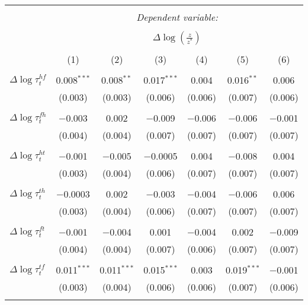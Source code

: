 \begin{tabular}{@{\extracolsep{5pt}}lcccccc} 
\\[-1.8ex]\hline 
\hline \\[-1.8ex] 
 & \multicolumn{6}{c}{\textit{Dependent variable:}} \\ 
\cline{2-7} 
\\[-1.8ex] & \multicolumn{6}{c}{$\Delta \log \left(\frac{z}{z^*} \right)$} \\ 
\\[-1.8ex] & (1) & (2) & (3) & (4) & (5) & (6)\\ 
\hline \\[-1.8ex] 
 $\Delta \log \tau_t^{hf}$ & 0.008$^{***}$ & 0.008$^{**}$ & 0.017$^{***}$ & 0.004 & 0.016$^{**}$ & 0.006 \\ 
  & (0.003) & (0.003) & (0.006) & (0.006) & (0.007) & (0.006) \\ 
  & & & & & & \\ 
 $\Delta \log \tau_t^{fh}$ & $-$0.003 & 0.002 & $-$0.009 & $-$0.006 & $-$0.006 & $-$0.001 \\ 
  & (0.004) & (0.004) & (0.007) & (0.007) & (0.007) & (0.007) \\ 
  & & & & & & \\ 
 $\Delta \log \tau_t^{ht}$ & $-$0.001 & $-$0.005 & $-$0.0005 & 0.004 & $-$0.008 & 0.004 \\ 
  & (0.003) & (0.004) & (0.006) & (0.007) & (0.007) & (0.007) \\ 
  & & & & & & \\ 
 $\Delta \log \tau_t^{th}$ & $-$0.0003 & 0.002 & $-$0.003 & $-$0.004 & $-$0.006 & 0.006 \\ 
  & (0.003) & (0.004) & (0.006) & (0.007) & (0.007) & (0.007) \\ 
  & & & & & & \\ 
 $\Delta \log \tau_t^{ft}$ & $-$0.001 & $-$0.004 & 0.001 & $-$0.004 & 0.002 & $-$0.009 \\ 
  & (0.004) & (0.004) & (0.007) & (0.006) & (0.007) & (0.007) \\ 
  & & & & & & \\ 
 $\Delta \log \tau_t^{tf}$ & 0.011$^{***}$ & 0.011$^{***}$ & 0.015$^{***}$ & 0.003 & 0.019$^{***}$ & $-$0.001 \\ 
  & (0.003) & (0.004) & (0.006) & (0.006) & (0.007) & (0.006) \\ 
  & & & & & & \\ 

\end{tabular}

